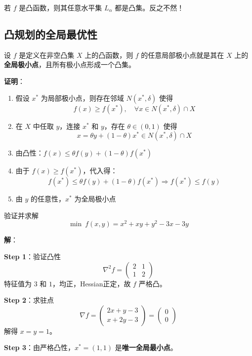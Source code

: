 \begin{property}[凸函数的水平集]
若 $f$ 是凸函数，则其任意水平集 $L_\alpha$ 都是凸集。反之不然！
\end{property}

\subsection{凸规划的全局最优性}

\begin{theorem}[凸规划的局部即全局]
设 $f$ 是定义在非空凸集 $X$ 上的凸函数，则 $f$ 的任意局部极小点就是其在 $X$ 上的\textbf{全局极小点}，且所有极小点形成一个凸集。
\end{theorem}

\textbf{证明}：
\begin{enumerate}[label=Step \arabic*:, leftmargin=2em]
    \item 假设 $x^*$ 为局部极小点，则存在邻域 $N(x^*, \delta)$ 使得
    \[f(x) \geq f(x^*),\quad \forall x \in N(x^*, \delta) \cap X\]
    \item 在 $X$ 中任取 $y$，连接 $x^*$ 和 $y$，存在 $\theta \in (0, 1)$ 使得
    \[x = \theta y + (1-\theta)x^* \in N(x^*, \delta) \cap X\]
    \item 由凸性：$f(x) \leq \theta f(y) + (1-\theta)f(x^*)$
    \item 由于 $f(x) \geq f(x^*)$，代入得：
    \[f(x^*) \leq \theta f(y) + (1-\theta)f(x^*) \Rightarrow f(x^*) \leq f(y)\]
    \item 由 $y$ 的任意性，$x^*$ 为全局极小点
\end{enumerate}

\begin{example}[凸规划的验证与求解]
验证并求解
\[
\min\ f(x, y) = x^2 + xy + y^2 - 3x - 3y
\]

\textbf{解}：

\textbf{Step 1}：验证凸性
\[
\nabla^2 f = \begin{pmatrix} 2 & 1 \\ 1 & 2 \end{pmatrix}
\]
特征值为 $3$ 和 $1$，均正，Hessian正定，故 $f$ 严格凸。

\textbf{Step 2}：求驻点
\[
\nabla f = \begin{pmatrix} 2x + y - 3 \\ x + 2y - 3 \end{pmatrix} = \begin{pmatrix} 0 \\ 0 \end{pmatrix}
\]
解得 $x = y = 1$。

\textbf{Step 3}：由严格凸性，$x^* = (1, 1)$ 是\textbf{唯一全局最小点}。
\end{example}

